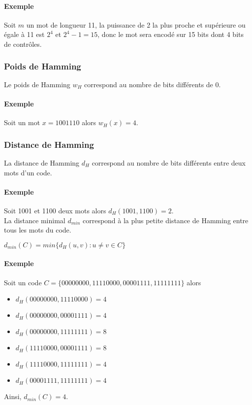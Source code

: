 \documentclass[a4paper, 12pt]{article}
\begin{document}
	\paragraph{Exemple} Soit $m$ un mot de longueur 11, la puissance de 2 la plus proche et supérieure ou égale à 11 est $2^4$ et $2^4- 1 = 15$, donc le mot sera encodé sur 15 bits dont 4 bits de contrôles.

	\subsubsection{Poids de Hamming}
	Le poids de Hamming $w_H$ correspond au nombre de bits différents de 0.
	\paragraph{Exemple} Soit un mot $x = 1001110$ alors $w_H(x)= 4$.

	\subsubsection{Distance de Hamming}
	La distance de Hamming $d_H$ correspond au nombre de bits différents entre deux mots d'un code.
	\paragraph{Exemple} Soit 1001 et 1100 deux mots alors $d_H(1001, 1100) = 2$.\\

	La distance minimal $d_{min}$ correspond à la plus petite distance de Hamming entre tous les mots du code.
	\begin{center}
		$d_{min} (C) = min \{ d_H (u, v) : u \neq v \in C \} $
	\end{center}
	\paragraph{Exemple}
	Soit un code $C = \{00000000, 11110000, 00001111, 11111111\}$ alors
	\begin{itemize}
		\item $d_H(00000000, 11110000) = 4$
		\item $d_H(00000000, 00001111) = 4$
		\item $d_H(00000000, 11111111) = 8$
		\item $d_H(11110000, 00001111) = 8$
		\item $d_H(11110000, 11111111) = 4$
		\item $d_H(00001111, 11111111) = 4$
	\end{itemize}
	Ainsi, $d_{min}(C) = 4$.\\
\end{document}
